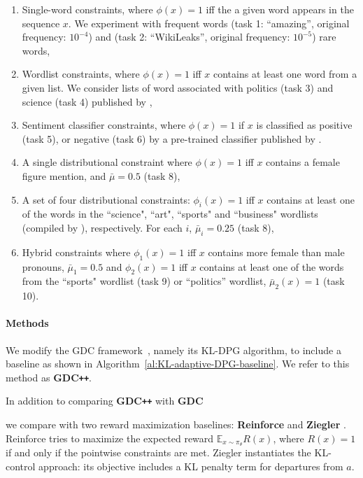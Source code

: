 \begin{enumerate}[label=(\alph*)]
    \itemsep0em \item Single-word constraints, where $\phi(x) = 1$ iff the a given word appears in the sequence $x$. We experiment with frequent words (task 1: ``amazing'', original frequency: $10^{-4}$) and (task 2: ``WikiLeaks'', original frequency: $10^{-5}$) rare words, \item Wordlist constraints, where $\phi(x) = 1$ iff $x$ contains at least one word from a given list. We consider lists of word associated with politics (task 3) and science (task 4) published by \citet{plug_and_play_20},
    \item Sentiment classifier constraints, where $\phi(x) = 1$ if $x$ is classified as positive (task 5), or negative (task 6) by a pre-trained classifier published by \citet{plug_and_play_20}.
    \setcounter{enumi}{3}
    \item A single distributional constraint where $\phi(x) = 1$ iff $x$ contains a female figure mention, and $\bar{\mu} = 0.5$ (task 8), \item A set of four distributional constraints: $\phi_i(x) = 1$ iff $x$ contains at least one of the words in the ``science", ``art", ``sports" and ``business" wordlists (compiled by \citet{plug_and_play_20}), respectively. For each $i$, $\bar{\mu}_i = 0.25$ (task 8), \item Hybrid constraints where $\phi_1(x) = 1$ iff $x$ contains more female than male pronouns, $\bar{\mu}_1 = 0.5$ and $\phi_2(x) = 1$ iff $x$ contains at least one of the words from the ``sports" wordlist (task 9) or ``politics'' wordlist, $\bar{\mu}_2(x) = 1$ (task 10).
\end{enumerate}

\paragraph{Methods}
We modify the GDC framework~\cite{khalifa_2021}, namely its KL-DPG algorithm, to include a baseline as shown in Algorithm~\ref{al:KL-adaptive-DPG-baseline}. We refer to this method as \textbf{GDC\texttt{++}}. 

In addition to comparing \textbf{GDC\texttt{++}} with \textbf{GDC}

we compare with two reward maximization baselines: \textbf{Reinforce} \citep{Williams92Reinforce} and \textbf{Ziegler} \citep{Ziegler19}. Reinforce tries to maximize the expected reward $\mathbb{E}_{x \sim {\pi_\theta}} R(x)$, where $R(x) =1$ if and only if the pointwise constraints are met. Ziegler instantiates the KL-control approach: its objective includes a KL penalty term for departures from $a$.

